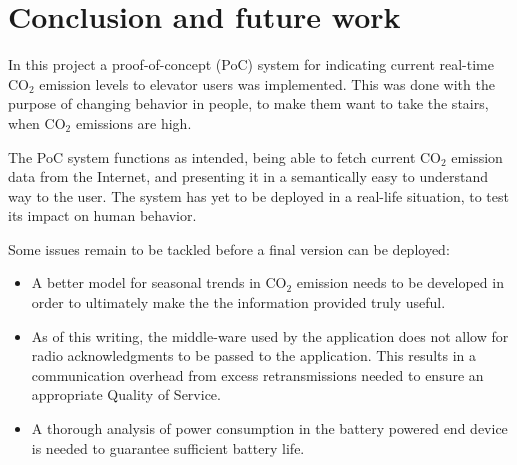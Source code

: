 \documentclass[Main]{subfiles}
\begin{document}
\section{Conclusion and future work} %
\label{sec:conclusionandfuturework}
	In this project a proof-of-concept (PoC) system for indicating current real-time CO$_2$ emission levels to elevator users was implemented.
	This was done with the purpose of changing behavior in people, to make them want to take the stairs, when CO$_2$ emissions are high. 

	The PoC system functions as intended, being able to fetch current CO$_2$ emission data from the Internet, and presenting it in a semantically easy to understand way to the user.
	The system has yet to be deployed in a real-life situation, to test its impact on human behavior.

	Some issues remain to be tackled before a final version can be deployed:

	\begin{itemize}
		\item 
			A better model for seasonal trends in CO$_2$ emission needs to be developed in order to ultimately make the the information provided truly useful.

		\item
			As of this writing, the middle-ware used by the application does not allow for radio acknowledgments to be passed to the application.
			This results in a communication overhead from excess retransmissions needed to ensure an appropriate Quality of Service.

		\item 
			A thorough analysis of power consumption in the battery powered end device is needed to guarantee sufficient battery life.

	\end{itemize}

\end{document}
